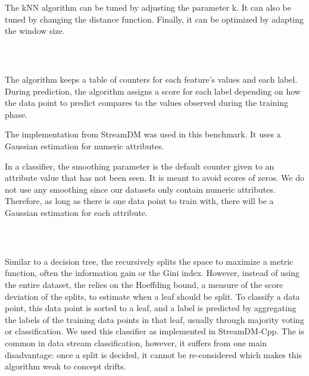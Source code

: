 The kNN algorithm can be tuned by adjusting the
parameter k. It can also be tuned by changing the
distance function. Finally, it can be optimized by
adapting the window size.

\subsubsection{\naivebayes~\cite{naive_bayes}}
The \naivebayes algorithm keeps a table of
counters for each feature's values and each label.
During prediction, the algorithm assigns a
score for each label depending on how the data
point to predict compares to the values observed
during the training phase.

The implementation from StreamDM was used in this
benchmark. It uses a Gaussian
estimation for numeric attributes.

In a \naivebayes classifier, the smoothing parameter is the
default counter given to an attribute value that
has not been seen. It is meant to avoid scores of zeros.
We do not use any smoothing since our datasets
only contain numeric
attributes. Therefore, as long as there is one data
point to train with, there will be a Gaussian
estimation for each attribute.

\subsubsection{\hoeffdingtree~\cite{VFDT}}
Similar to a decision tree, the \hoeffdingtree
recursively splits the space to maximize a metric
function, often the information gain or the Gini
index. However, instead of using the entire
dataset, the \hoeffdingtree relies on the
Hoeffding bound, a measure of the score deviation
of the splits, to estimate when a leaf should be
split. To classify a data point, this data point
is sorted to a leaf, and a label is predicted by
aggregating the labels of the training data points
in that leaf, usually through majority voting or
\naivebayes classification.  We used this
classifier as implemented in StreamDM-Cpp.  The
\hoeffdingtree is common in data stream
classification, however, it suffers from one main
disadvantage: once a split is decided, it cannot
be re-considered which makes this algorithm weak
to concept drifts.

